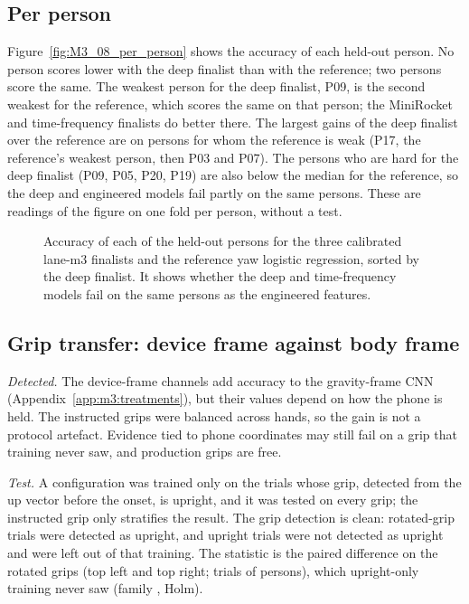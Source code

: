 
\subsection{Per person}\label{app:m3:perperson}

Figure~\ref{fig:M3_08_per_person} shows the accuracy of each held-out person.
No person scores lower with the deep finalist than with the reference; two persons score the same.
The weakest person for the deep finalist, P09, is the second weakest for the reference, which scores the same on that person; the MiniRocket and time-frequency finalists do better there.
The largest gains of the deep finalist over the reference are on persons for whom the reference is weak (P17, the reference's weakest person, then P03 and P07).
The persons who are hard for the deep finalist (P09, P05, P20, P19) are also below the median for the reference, so the deep and engineered models fail partly on the same persons.
These are readings of the figure on one fold per person, without a test.

\begin{figure}[tbp]
  \centering
  \caption{Accuracy of each of the  held-out persons for the three calibrated lane-m3 finalists and the reference yaw logistic regression, sorted by the deep finalist. It shows whether the deep and time-frequency models fail on the same persons as the engineered features.}
  \label{fig:M3_08_per_person}\label{fig:app:m3-perperson}
\end{figure}

\subsection{Grip transfer: device frame against body frame}\label{app:m3:grip}

\emph{Detected.} The device-frame channels add accuracy to the gravity-frame CNN (Appendix~\ref{app:m3:treatments}), but their values depend on how the phone is held.
The instructed grips were balanced across hands, so the gain is not a protocol artefact.
Evidence tied to phone coordinates may still fail on a grip that training never saw, and production grips are free.

\emph{Test.} A configuration was trained only on the trials whose grip, detected from the up vector before the onset, is upright, and it was tested on every grip; the instructed grip only stratifies the result.
The grip detection is clean:  rotated-grip trials were detected as upright, and  upright trials were not detected as upright and were left out of that training.
The statistic is the paired difference on the rotated grips (top left and top right;  trials of  persons), which upright-only training never saw (family , Holm).

